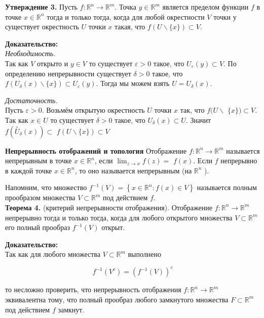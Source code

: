 \documentclass[a4paper,12pt]{article} %
\begin{document}
	\textbf{Утверждение 3.} Пусть $f: \mathbb{R}^{n} \rightarrow \mathbb{R}^{m}$. Точка $y \in \mathbb{R}^{m}$ является пределом функции $f$ в точке $x \in \mathbb{R}^{n}$ тогда и только тогда, когда для любой окрестности $V$ точки у существует окрестность $U$ точки $x$ такая, что $f(U \backslash\{x\}) \subset V$.
	
	\textbf{Доказательство:\\}
	\textit{Необходимость.}\\ Так как $V$ открыто и $y \in V$ то существует $\varepsilon>0$ такое, что $U_{\varepsilon}(y) \subset V$. По определению непрерывности существует $\delta>0$ такое, что $f\left(U_{\delta}(x) \backslash\{x\}\right) \subset U_{\varepsilon}(y)$. Тогда мы можем взять $U=U_{\delta}(x)$.
	
	\textit{Достаточность.}\\ Пусть $\varepsilon>0$. Возьмём открытую окрестность $U$ точки $x$ так, что $f(U \backslash$ $\{x\}) \subset V$. Так как $x \in U$ то существует $\delta>0$ такое, что $U_{\delta}(x) \subset U$. Значит $f\left(\stackrel{\circ}{U}_{\delta}(x)\right) \subset$ $f(U \backslash\{x\}) \subset V$
	
	\textbf{Непрерывность отображений и топология}
	Отображение $f: \mathbb{R}^{n} \rightarrow \mathbb{R}^{m}$ называется непрерывным в точке $x \in \mathbb{R}^{n}$, если $\lim _{z \rightarrow x} f(z)=$ $f(x)$. Если $f$ непрерывно в каждой точке $x \in \mathbb{R}^{n}$, то оно называется непрерывным (на $\mathbb{R}^{n}$ ).
	
	Напомним, что множество $f^{-1}(V)=\left\{x \in \mathbb{R}^{n}: f(x) \in V\right\}$ называется полным прообразом множества $V \subset \mathbb{R}^{m}$ под действием $f$.\\
	\textbf{Теорема 4.} (критерий непрерывности отображения). Отображение $f: \mathbb{R}^{n} \rightarrow \mathbb{R}^{m}$ непрерывно тогда и только тогда, когда для любого открытого множества $V \subset \mathbb{R}^{m}$ его полный прообраз $f^{-1}(V)$ открыт.
	
	\textbf{Доказательство:\\}
	Так как для любого множества $V \subset \mathbb{R}^{m}$ выполнено
	
	$$
	f^{-1}\left(V^{c}\right)=\left(f^{-1}(V)\right)^{c}
	$$
	
	то несложно проверить, что непрерывность отображения $f: \mathbb{R}^{n} \rightarrow \mathbb{R}^{m}$ эквивалентна тому, что полный прообраз любого замкнутого множества $F \subset \mathbb{R}^{m}$ под действием $f$ замкнут.
	
\end{document}
